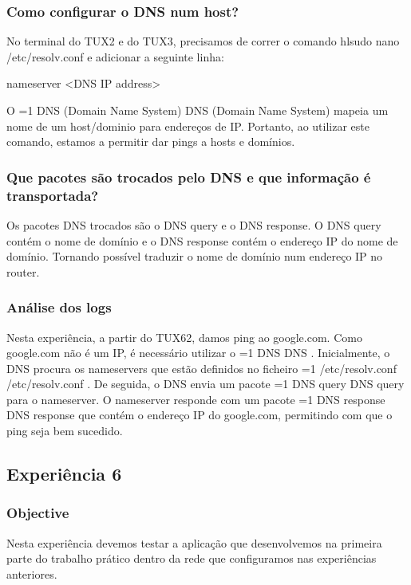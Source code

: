 \documentclass[11pt,a4paper]{article}
\newcommand{\hl}[2][1]{%
  \ifnum#1=1\relax
    \textcolor{text-hl1}{#2}%
  \else
    \textcolor{text-hl2}{#2}%
  \fi
}
\begin{document}
\begin{multicols}{2}
\subsubsection{ Como configurar o DNS num host?}

No terminal do TUX2 e do TUX3, precisamos de correr o comando hl{sudo nano /etc/resolv.conf} e adicionar a seguinte linha:

\begin{bash-darktheme}
    nameserver <DNS IP address>
\end{bash-darktheme}

O \hl{DNS (Domain Name System)} mapeia um nome de um host/dominio para endereços de IP. Portanto, ao utilizar este comando, estamos a permitir dar pings a hosts e domínios.

\subsubsection{ Que pacotes são trocados pelo DNS e que informação é transportada?}

Os pacotes DNS  trocados são o DNS query e o DNS response. O DNS query contém o nome de domínio e o DNS response contém o endereço IP do nome de domínio. Tornando possível traduzir o nome de domínio num endereço IP no router.

\subsubsection{Análise dos logs}

Nesta experiência, a partir do TUX62, damos ping ao google.com. Como google.com não é um IP, é necessário utilizar o \hl{DNS}. 
Inicialmente, o DNS procura os nameservers que estão definidos no ficheiro \hl{/etc/resolv.conf}. De seguida, o DNS envia um pacote \hl{DNS query} para o nameserver. O nameserver responde com um pacote \hl{DNS response} que contém o endereço IP do google.com, permitindo com que o ping seja bem sucedido.

\subsection{Experiência 6}

\subsubsection{Objective} 

Nesta experiência devemos testar a aplicação que desenvolvemos na primeira parte do trabalho prático dentro da rede que configuramos nas experiências anteriores.


\end{multicols}
\end{document}
